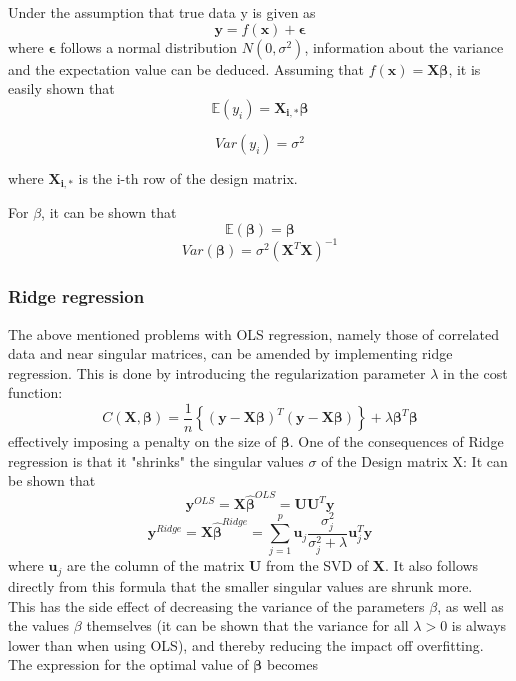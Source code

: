 \documentclass[11pt,a4paper,titlepage]{article}
\begin{document}
Under the assumption that true data y is given as
\begin{equation*}
\bm{y}=f(\bm{x})+\bm{\epsilon}
\end{equation*}
where $\bm{\epsilon}$ follows a normal distribution $N(0,\sigma^2)$, information about the variance and the expectation value can be deduced. Assuming that $f(\bm{x})=\bm{X\beta}$, it is easily shown that
\begin{equation*}
\mathbb{E}(y_i)=\bm{X_{i,*}\beta}
\end{equation*}

\begin{equation*}
Var(y_i)=\sigma^2
\end{equation*}

where $\bm{X_{i,*}}$ is the i-th row of the design matrix.

For $\beta$, it can be shown that \citep{HW2}
\begin{equation*}
\mathbb{E}(\bm{\beta})=\bm{\beta}
\end{equation*}
\begin{equation*}
Var(\bm{\beta})=\sigma^2(\bm{X}^T\bm{X})^{-1}
\end{equation*}
\subsubsection{Ridge regression}
The above mentioned problems with OLS regression, namely those of correlated data and near singular matrices, can be amended by implementing ridge regression. This is done by introducing the regularization parameter $ \lambda$ in the cost function:
\begin{equation*}
    C(\boldsymbol{X},\boldsymbol{\beta})=\frac{1}{n}\left\{(\boldsymbol{y}-\boldsymbol{X}\boldsymbol{\beta})^T(\boldsymbol{y}-\boldsymbol{X}\boldsymbol{\beta})\right\}+\lambda\boldsymbol{\beta}^T\boldsymbol{\beta}
\end{equation*}
effectively imposing a penalty on the size of $\boldsymbol{\beta}$. One of the consequences of Ridge regression is that it "shrinks" the singular values $\sigma$ of the Design matrix X: It can be shown that \citep{hastie01statisticallearning}
\begin{equation*}
\bm{y}^{OLS}=\bm{X\hat\beta}^{OLS}=\bm{UU}^T\bm{y}
\end{equation*}
\begin{equation*}
\bm{y}^{Ridge}=\bm{X\hat\beta}^{Ridge}=\sum_{j=1}^{p}\bm{u}_j\frac{\sigma_j^2}{\sigma_j^2+\lambda}\bm{u}^T_j\bm{y}
\end{equation*}
where $\bm{u}_j$ are the column of the matrix $\bm{U}$ from the SVD of $\bm{X}$. It also follows directly from this formula that the smaller singular values are shrunk more.\\
This has the side effect of decreasing the variance of the parameters $\beta$, as well as the values $\beta$ themselves (it can be shown \citep{Ridge_Lecture_Notes} that the variance for all $\lambda>0$ is always lower than when using OLS), and thereby reducing the impact off overfitting.\\The expression for the optimal value of $\boldsymbol{\beta}$ becomes
\end{document}
